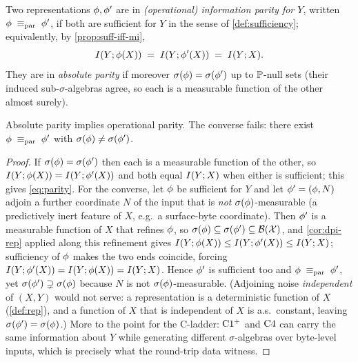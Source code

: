 \begin{definition}
\label{def:parity}
Two representations $\phi, \phi'$ are in \emph{(operational) information
parity for $Y$}, written $\phi \;\equiv_{\mathrm{par}}\; \phi'$, if both are sufficient for
$Y$ in the sense of \cref{def:sufficiency}; equivalently, by
\cref{prop:suff-iff-mi},
\begin{equation}
  \label{eq:parity}
  I(Y ; \phi(X)) \;=\; I(Y ; \phi'(X)) \;=\; I(Y ; X).
\end{equation}
They are in \emph{absolute parity} if moreover $\sigma\!\left(\phi\right) = \sigma\!\left(\phi'\right)$
up to $\mathbb{P}$-null sets (their induced sub-$\sigma$-algebras agree, so each is
a measurable function of the other almost surely).
\end{definition}

\begin{proposition}
\label{prop:abs-strict}
Absolute parity implies operational parity. The converse fails: there exist
$\phi \;\equiv_{\mathrm{par}}\; \phi'$ with $\sigma\!\left(\phi\right) \ne \sigma\!\left(\phi'\right)$.
\end{proposition}

\begin{proof}
If $\sigma\!\left(\phi\right)=\sigma\!\left(\phi'\right)$ then each is a measurable function of the
other, so $I(Y ; \phi(X))=I(Y ; \phi'(X))$ and both equal $I(Y ; X)$ when
either is sufficient; this gives \eqref{eq:parity}. For the converse, let $\phi$
be sufficient for $Y$ and let $\phi' = (\phi, N)$ adjoin a further coordinate
$N$ of the input that is \emph{not} $\sigma\!\left(\phi\right)$-measurable (a predictively inert
feature of $X$, e.g.\ a surface-byte coordinate). Then $\phi'$ is a measurable
function of $X$ that refines $\phi$, so $\sigma\!\left(\phi\right) \subseteq \sigma\!\left(\phi'\right)
\subseteq \mathcal{B}(\mathcal{X})$, and \cref{cor:dpi-rep} applied along this refinement
gives $I(Y ; \phi(X)) \le I(Y ; \phi'(X)) \le I(Y ; X)$; sufficiency of $\phi$
makes the two ends coincide, forcing $I(Y ; \phi'(X))=I(Y ; \phi(X))=I(Y ; X)$.
Hence $\phi'$ is sufficient too and $\phi\;\equiv_{\mathrm{par}}\;\phi'$, yet $\sigma\!\left(\phi'\right)
\supsetneq \sigma\!\left(\phi\right)$ because $N$ is not $\sigma\!\left(\phi\right)$-measurable. (Adjoining
noise \emph{independent} of $(X,Y)$ would not serve: a representation is a
deterministic function of $X$ (\cref{def:rep}), and a function of $X$ that is
independent of $X$ is a.s.\ constant, leaving $\sigma\!\left(\phi'\right)=\sigma\!\left(\phi\right)$.)
More to the point for the C-ladder:
$\mathrm{C1^{+}}$ and $\mathrm{C}4$ can carry the same information about $Y$ while
generating different $\sigma$-algebras over byte-level inputs, which is
precisely what the round-trip data witness.
\end{proof}

